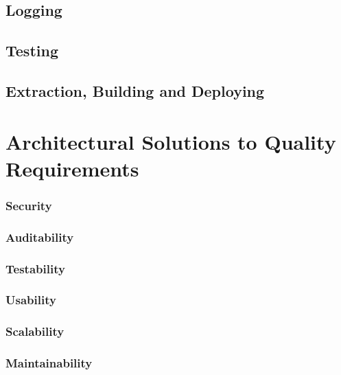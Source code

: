 \documentclass[12pt]{article}
\begin{document}
                    \subsection{Logging}
                    
                    \subsection{Testing}
                    
                    \subsection{Extraction, Building and Deploying}
                    
               \section{Architectural Solutions to Quality Requirements}
               
               		\subsubsection{Security }
                   	\subsubsection{Auditability}

                  	\subsubsection{Testability}
                  	
                  	\subsubsection{Usability}
                  	
                  	\subsubsection{Scalability}
                  	
                  	\subsubsection{Maintainability}
                  	
\end{document}
